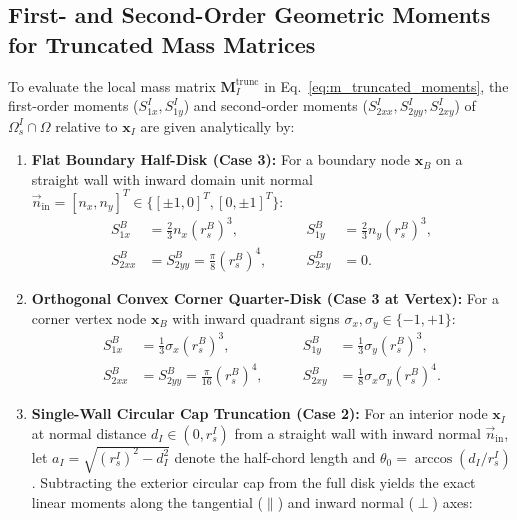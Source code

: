 \documentclass[preprint,12pt]{elsarticle}
\begin{document}
\subsection{First- and Second-Order Geometric Moments for Truncated Mass Matrices}
To evaluate the local mass matrix $\mathbf{M}_I^{\mathrm{trunc}}$ in Eq.~\eqref{eq:m_truncated_moments}, the first-order moments ($S_{1x}^I, S_{1y}^I$) and second-order moments ($S_{2xx}^I, S_{2yy}^I, S_{2xy}^I$) of $\Omega_s^I \cap \Omega$ relative to $\mathbf{x}_I$ are given analytically by:
\begin{enumerate}
    \item \textbf{Flat Boundary Half-Disk (Case 3):} For a boundary node $\mathbf{x}_B$ on a straight wall with inward domain unit normal $\vec{n}_{\mathrm{in}} = [n_x, n_y]^T \in \{[\pm 1, 0]^T, [0, \pm 1]^T\}$:
          \begin{equation}
              \begin{aligned}
                  S_{1x}^B  & = \frac{2}{3} n_x (r_s^B)^3, \qquad           & S_{1y}^B  & = \frac{2}{3} n_y (r_s^B)^3, \\
                  S_{2xx}^B & = S_{2yy}^B = \frac{\pi}{8} (r_s^B)^4, \qquad & S_{2xy}^B & = 0.
              \end{aligned}
          \end{equation}
    \item \textbf{Orthogonal Convex Corner Quarter-Disk (Case 3 at Vertex):} For a corner vertex node $\mathbf{x}_B$ with inward quadrant signs $\sigma_x, \sigma_y \in \{-1, +1\}$:
          \begin{equation}
              \begin{aligned}
                  S_{1x}^B  & = \frac{1}{3} \sigma_x (r_s^B)^3, \qquad       & S_{1y}^B  & = \frac{1}{3} \sigma_y (r_s^B)^3,           \\
                  S_{2xx}^B & = S_{2yy}^B = \frac{\pi}{16} (r_s^B)^4, \qquad & S_{2xy}^B & = \frac{1}{8} \sigma_x \sigma_y (r_s^B)^4.
              \end{aligned}
          \end{equation}
    \item \textbf{Single-Wall Circular Cap Truncation (Case 2):} For an interior node $\mathbf{x}_I$ at normal distance $d_I \in (0, r_s^I)$ from a straight wall with inward normal $\vec{n}_{\mathrm{in}}$, let $a_I = \sqrt{(r_s^I)^2 - d_I^2}$ denote the half-chord length and $\theta_0 = \arccos(d_I / r_s^I)$. Subtracting the exterior circular cap from the full disk yields the exact linear moments along the tangential ($\parallel$) and inward normal ($\perp$) axes:

\end{enumerate}
\end{document}
